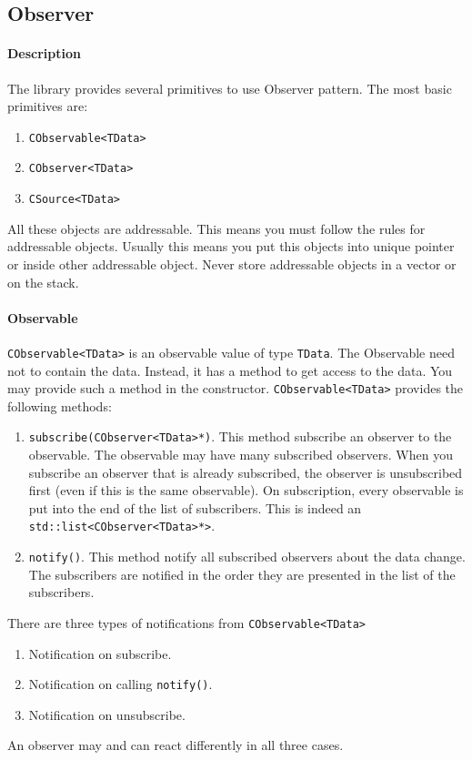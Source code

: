\documentclass{article}
\begin{document}
\subsection{Observer}\label{section::Observer}

\paragraph{Description} The library provides several primitives to use Observer pattern. The most basic primitives are:
\begin{enumerate}
\item \verb"CObservable<TData>"
\item \verb"CObserver<TData>"
\item \verb"CSource<TData>"
\end{enumerate}

All these objects are addressable. This means you must follow the rules for addressable objects. Usually this means you put this objects into unique pointer or inside other addressable object. Never store addressable objects in a vector or on the stack.

\paragraph{Observable}
\verb"CObservable<TData>" is an observable value of type \verb"TData". The Observable need not to contain the data. Instead, it has a method to get access to the data. You may provide such a method in the constructor. \verb"CObservable<TData>" provides the following methods:
\begin{enumerate}
\item \verb"subscribe(CObserver<TData>*)". This method subscribe an observer to the observable. The observable may have many subscribed observers. When you subscribe an observer that is already subscribed, the observer is unsubscribed first (even if this is the same observable). On subscription, every observable is put into the end of the list of subscribers. This is indeed an \verb"std::list<CObserver<TData>*>".

\item \verb"notify()". This method notify all subscribed observers about the data change. The subscribers are notified in the order they are presented in the list of the subscribers.
\end{enumerate}

There are three types of notifications from \verb"CObservable<TData>"
\begin{enumerate}
\item Notification on subscribe.
\item Notification on calling \verb"notify()".
\item Notification on unsubscribe.
\end{enumerate}
An observer may and can react differently in all three cases.
\end{document}
